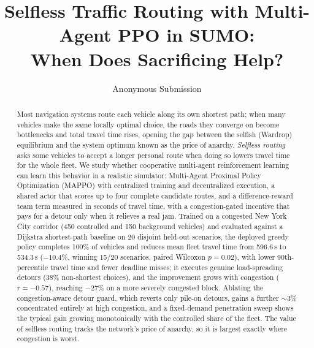 \documentclass[letterpaper]{article} %
\title{Selfless Traffic Routing with Multi-Agent PPO in SUMO:\\When Does Sacrificing Help?}
\author{Anonymous Submission}
\begin{document}
\maketitle

\begin{abstract}
Most navigation systems route each vehicle along its own shortest path; when many
vehicles make the same locally optimal choice, the roads they converge on become
bottlenecks and total travel time rises, opening the gap between the selfish (Wardrop)
equilibrium and the system optimum known as the price of anarchy. \emph{Selfless
routing} asks some vehicles to accept a longer personal route when doing so lowers
travel time for the whole fleet. We study whether cooperative multi-agent
reinforcement learning can learn this behavior in a realistic simulator: Multi-Agent
Proximal Policy Optimization (MAPPO) with centralized training and decentralized
execution, a shared actor that scores up to four complete candidate routes, and a
difference-reward team term measured in seconds of travel time, with a congestion-gated
incentive that pays for a detour only when it relieves a real jam. Trained on a congested
New York City corridor (450 controlled and 150 background vehicles) and evaluated against a
Dijkstra shortest-path baseline on 20 disjoint held-out scenarios, the deployed greedy
policy completes 100\% of vehicles and reduces mean fleet travel time from 596.6\,s to
534.3\,s ($-10.4\%$, winning 15/20 scenarios, paired Wilcoxon $p{=}0.02$), with lower
90th-percentile travel time and fewer deadline misses; it executes genuine load-spreading
detours (38\% non-shortest choices), and the improvement grows with congestion
($r=-0.57$), reaching $-27\%$ on a more severely congested block.
Ablating the congestion-aware detour guard, which reverts only pile-on detours, gains a
further $\sim$3\% concentrated entirely at high congestion, and a fixed-demand penetration
sweep shows the typical gain growing monotonically with the controlled share of the fleet.
The value of selfless routing tracks the network's price of anarchy, so it is largest
exactly where congestion is worst.
\end{abstract}







\end{document}
